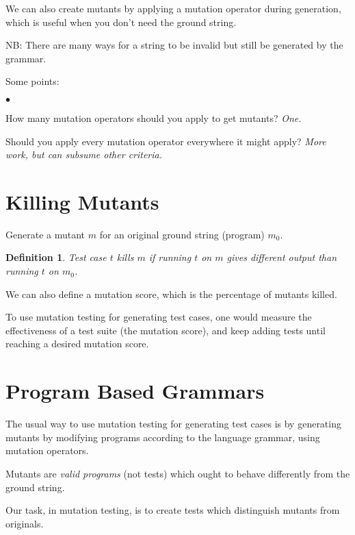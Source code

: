 \documentclass[11pt]{article}
\newtheorem{defn}{Definition}
\newcommand{\squishlist}{
 \begin{list}{$\bullet$}
  { \setlength{\itemsep}{0pt}
     \setlength{\parsep}{3pt}
     \setlength{\topsep}{3pt}
     \setlength{\partopsep}{0pt}
     \setlength{\leftmargin}{1.5em}
     \setlength{\labelwidth}{1em}
     \setlength{\labelsep}{0.5em} } }
\newcommand{\squishend}{
  \end{list}  }
\begin{document}


We can also create mutants by applying a mutation operator during generation,
which is useful when you don't need the ground string.

NB: There are many ways for a string to be invalid but still be generated
by the grammar.

Some points:
\squishlist
\item How many mutation operators should you apply to get mutants? \emph{One.}
\item Should you apply every mutation operator everywhere it might apply? \emph{More work, but can subsume other criteria.}
\squishend

\section*{Killing Mutants} 
Generate a mutant $m$ for an original ground string (program) $m_0$.
\begin{defn}
Test case $t$ \emph{kills} $m$ if running $t$ on $m$ gives different 
output than running $t$ on $m_0$.
\end{defn}

We can also define a mutation score, which is the percentage of mutants killed.

To use mutation testing for generating test cases, one would measure
the effectiveness of a test suite (the mutation score), and keep adding
tests until reaching a desired mutation score.

\section*{Program Based Grammars} 

The usual way to use mutation testing for generating test cases is by
generating mutants by modifying programs according to the language
grammar, using mutation operators.

Mutants are \emph{valid programs} (not tests) which ought to behave
differently from the ground string.

Our task, in mutation testing, is to create tests which distinguish
mutants from originals.
\end{document}
